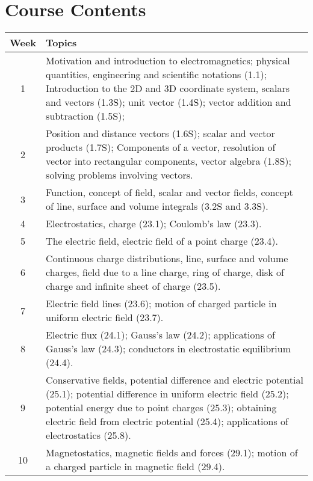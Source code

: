 \documentclass[12pt,a4paper]{article}
\begin{document}
\section{Course Contents}
\begin{center}
\vspace{-0.5cm}
	\begin{longtable}{|c|p{13cm}|}
	\hline \hline
		\rule{0pt}{2.6ex} \textbf{Week} & \textbf{Topics}\\
		\hline
		1 \rule{0pt}{2.6ex} & Motivation and introduction to electromagnetics; physical quantities, engineering and scientific notations (1.1); Introduction to the 2D and 3D coordinate system, scalars and vectors (1.3S); unit vector (1.4S); vector addition and subtraction (1.5S);\\
		\hline
		2 \rule{0pt}{2.6ex} & Position and distance vectors (1.6S); scalar and vector products (1.7S); Components of a vector, resolution of vector into rectangular components, vector algebra (1.8S); solving problems involving vectors.\\
		\hline
		3 \rule{0pt}{2.6ex} & Function, concept of field, scalar and vector fields, concept of line, surface and volume integrals (3.2S and 3.3S).\\
		\hline
		4 \rule{0pt}{2.6ex} & Electrostatics, charge (23.1); Coulomb's law (23.3).\\
		\hline
		5 \rule{0pt}{2.6ex} &  The electric field, electric field of a point charge (23.4).\\
		\hline
		\hline
		6 \rule{0pt}{2.6ex} & Continuous charge distributions, line, surface and volume charges,  field due to a line charge, ring of charge, disk of charge and infinite sheet of charge (23.5).\\
		\hline
		7 \rule{0pt}{2.6ex} & Electric field lines (23.6); motion of charged particle in uniform electric field (23.7).\\
		\hline
		8 \rule{0pt}{2.6ex} & Electric flux (24.1); Gauss's law (24.2); applications of Gauss's law (24.3); conductors in electrostatic equilibrium (24.4).\\
		\hline
		9 \rule{0pt}{2.6ex} & Conservative fields, potential difference and electric potential (25.1); potential difference in uniform electric field (25.2); potential energy due to point charges (25.3); obtaining electric field from electric potential (25.4); applications of electrostatics (25.8).\\
		\hline
		10 \rule{0pt}{2.6ex} & Magnetostatics, magnetic fields and forces (29.1); motion of a charged particle in magnetic field (29.4).\\

\end{longtable}
\end{center}
\end{document}
